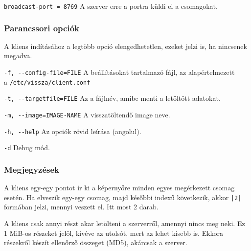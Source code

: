 \documentclass[fleqn,10pt,a4paper,titlepage]{article}
\begin{document}
  
  \texttt{broadcast-port = 8769} A szerver erre a portra küldi el a csomagokat.

  \subsubsection{Parancssori opciók}
  A kliens indításához a legtöbb opció elengedhetetlen, ezeket jelzi is, ha nincsenek megadva.
  
  \texttt{-f, -{}-config-file=FILE} A beállításokat tartalmazó fájl, az alapértelmezett\\ a \texttt{/etc/vissza/client.conf}
  
  \texttt{-t, -{}-targetfile=FILE} Az a fájlnév, amibe menti a letöltött adatokat.

  \texttt{-m, -{}-image=IMAGE-NAME} A visszatöltendő image neve.

  \texttt{-h, -{}-help} Az opciók rövid leírása (angolul).
  
  \texttt{-d}  Debug mód.

  \subsubsection{Megjegyzések}
  A kliens egy-egy pontot ír ki a képernyőre minden egyes megérkezett csomag esetén. Ha elveszik egy-egy csomag, majd
  későbbi indexű következik, akkor \texttt{|2|} formában jelzi, mennyi veszett el. Itt most 2 darab.
  
  A kliens csak annyi részt akar letölteni a szerverről, amennyi nincs meg neki. Ez 1 MiB-os részeket jelöl, kivéve az
  utolsót, mert az lehet kisebb is. Ekkora részekről készít ellenőrző összeget (MD5), akárcsak a szerver.
\end{document}
